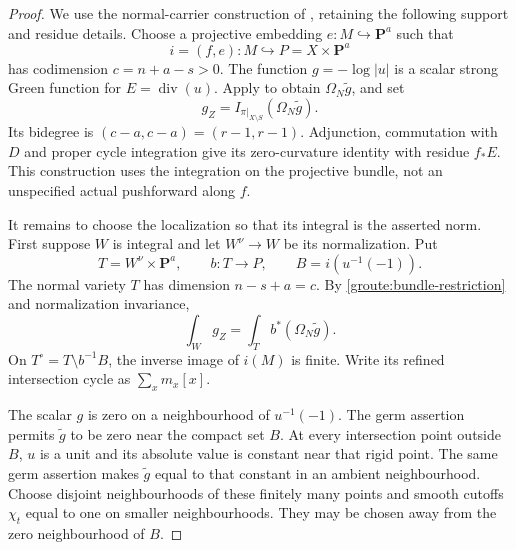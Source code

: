 \documentclass[11pt,a4paper]{article}
\theoremstyle{definition}
\numberwithin{equation}{section}
\newcommand{\Div}{\operatorname{div}}
\begin{document}
\begin{proof}
We use the normal-carrier construction of \cite[Proposition \texttt{r16ph:principal-push}]{PH16}, retaining the following support and residue details. Choose a projective embedding $e:M\hookrightarrow\mathbf P^a$ such that
\[
 i=(f,e):M\hookrightarrow P=X\times\mathbf P^a
\]
has codimension $c=n+a-s>0$. The function $g=-\log|u|$ is a scalar strong Green function for $E=\Div(u)$. Apply  to obtain $\Omega_N\widetilde g$, and set
\begin{equation}\label{groute:principal-form}
 g_Z=I_{\pi|_{X\setminus S}}(\Omega_N\widetilde g).
\end{equation}
Its bidegree is $(c-a,c-a)=(r-1,r-1)$. Adjunction, commutation with $D$ and proper cycle integration give its zero-curvature identity with residue $f_*E$. This construction uses the integration on the projective bundle, not an unspecified actual pushforward along $f$.

It remains to choose the localization so that its integral is the asserted norm. First suppose $W$ is integral and let $W^\nu\to W$ be its normalization. Put
\[
 T=W^\nu\times\mathbf P^a,
 \qquad b:T\longrightarrow P,
 \qquad B=i(u^{-1}(-1)).
\]
The normal variety $T$ has dimension $n-s+a=c$. By \eqref{groute:bundle-restriction} and normalization invariance,
\begin{equation}\label{groute:principal-top}
 \int_Wg_Z=\int_T b^*(\Omega_N\widetilde g).
\end{equation}
On $T^\circ=T\setminus b^{-1}B$, the inverse image of $i(M)$ is finite. Write its refined intersection cycle as $\sum_xm_x[x]$.

The scalar $g$ is zero on a neighbourhood of $u^{-1}(-1)$. The germ assertion permits $\widetilde g$ to be zero near the compact set $B$. At every intersection point outside $B$, $u$ is a unit and its absolute value is constant near that rigid point. The same germ assertion makes $\widetilde g$ equal to that constant in an ambient neighbourhood. Choose disjoint neighbourhoods of these finitely many points and smooth cutoffs $\chi_t$ equal to one on smaller neighbourhoods. They may be chosen away from the zero neighbourhood of $B$.


\end{proof}
\end{document}
